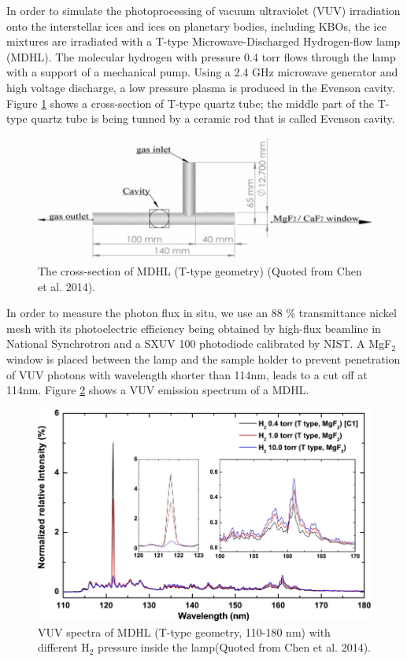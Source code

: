 In order to simulate the photoprocessing of vacuum ultraviolet (VUV) irradiation onto the interstellar ices and ices on planetary bodies, including KBOs, the ice mixtures are irradiated with a T-type Microwave-Discharged Hydrogen-flow lamp (MDHL). The molecular hydrogen with pressure 0.4 torr flows through the lamp with a support of a mechanical pump. Using a 2.4 GHz microwave generator and high voltage discharge, a low pressure plasma is produced in the Evenson cavity. Figure \ref{fig:T_type} shows a cross-section of T-type quartz tube; the middle part of the T-type quartz tube is being tunned by a ceramic rod that is called Evenson cavity.
\begin{figure}
\centering
\includegraphics[width=\textwidth]{figures/chapter2/T_type.jpg}
\caption{The cross-section of MDHL (T-type geometry) (Quoted from Chen et al. 2014).}
\label{fig:T_type}
\end{figure}
In order to measure the photon flux in situ, we use an 88 \% transmittance nickel mesh with its photoelectric efficiency being obtained by high-flux beamline in National Synchrotron and a SXUV 100 photodiode calibrated by NIST. A MgF$_2$ window is placed between the lamp and the sample holder to prevent penetration of VUV photons with wavelength shorter than 114nm, leads to a cut off at 114nm. Figure \ref{fig:MDHL} shows a VUV emission spectrum of a MDHL.
\begin{figure}
\centering
\includegraphics[width=\textwidth]{figures/chapter2/MDHL.jpg}
\caption{VUV spectra of MDHL (T-type geometry, 110-180 nm) with different H$_2$ pressure inside the lamp(Quoted from Chen et al. 2014).}
\label{fig:MDHL}
\end{figure}
